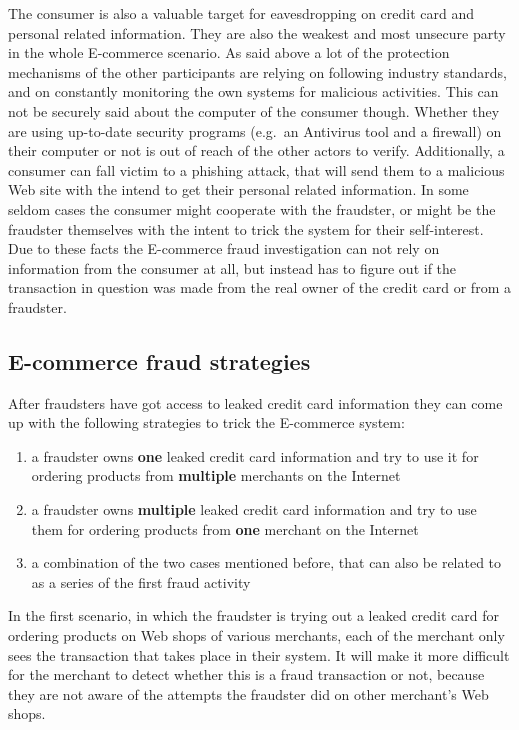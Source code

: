 The consumer is also a valuable target for eavesdropping on credit card and personal related information. They are also the weakest and most unsecure party in the whole E-commerce scenario. As said above a lot of the protection mechanisms of the other participants are relying on following industry standards, and on constantly monitoring the own systems for malicious activities. This can not be securely said about the computer of the consumer though. Whether they are using up-to-date security programs (e.g.\ an Antivirus tool and a firewall) on their computer or not is out of reach of the other actors to verify. Additionally, a consumer can fall victim to a phishing attack, that will send them to a malicious Web site with the intend to get their personal related information. In some seldom cases the consumer might cooperate with the fraudster, or might be the fraudster themselves with the intent to trick the system for their self-interest. Due to these facts the \gls{E-commerce} fraud investigation can not rely on information from the consumer at all, but instead has to figure out if the transaction in question was made from the real owner of the credit card or from a fraudster.


\subsection{E-commerce fraud strategies}
\label{subsec:strategies_fraudster}

After fraudsters have got access to leaked credit card information they can come up with the following strategies to trick the \gls{E-commerce} system:\@

\begin{enumerate}
  \item a fraudster owns \textbf{one} leaked credit card information and try to use it for ordering products from \textbf{multiple} merchants on the Internet
  \item a fraudster owns \textbf{multiple} leaked credit card information and try to use them for ordering products from \textbf{one} merchant on the Internet
  \item a combination of the two cases mentioned before, that can also be related to as a series of the first fraud activity
\end{enumerate}

In the first scenario, in which the fraudster is trying out a leaked credit card for ordering products on Web shops of various merchants, each of the merchant only sees the transaction that takes place in their system. It will make it more difficult for the merchant to detect whether this is a fraud transaction or not, because they are not aware of the attempts the fraudster did on other merchant's Web shops. \\

